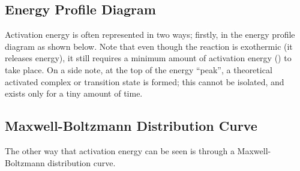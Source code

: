 		\pagebreak
		\subsection{Energy Profile Diagram}

			Activation energy is often represented in two ways; firstly, in the energy profile diagram as shown below. Note that even though
			the reaction is exothermic (it releases energy), it still requires a minimum amount of activation energy (\ea) to take place. On a side
			note, at the top of the energy \enquote{peak}, a theoretical activated complex or transition state is formed; this cannot be isolated, and
			exists only for a tiny amount of time.





		\subsection{Maxwell-Boltzmann Distribution Curve}

			The other way that activation energy can be seen is through a Maxwell-Boltzmann distribution curve.

